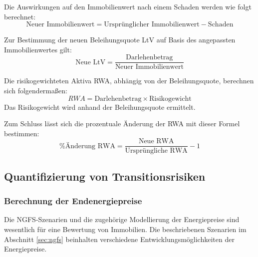 Die Auswirkungen auf den Immobilienwert nach einem Schaden werden wie folgt berechnet:
\begin{equation}
    \text{Neuer Immobilienwert} = \text{Ursprünglicher Immobilienwert} - \text{Schaden}
\end{equation}

Zur Bestimmung der neuen Beleihungsquote \ac{LtV} auf Basis des angepassten Immobilienwertes gilt:
\begin{equation}
    \text{Neue LtV} = \frac{\text{Darlehenbetrag}}{\text{Neuer Immobilienwert}}
\end{equation}

Die risikogewichteten Aktiva \acs{RWA}, abhängig von der Beleihungsquote, berechnen sich folgendermaßen:
\begin{equation}
    RWA = \text{Darlehenbetrag} \times \text{Risikogewicht}
\end{equation}
Das Risikogewicht wird anhand der Beleihungsquote ermittelt.

Zum Schluss lässt sich die prozentuale Änderung der \acs{RWA} mit dieser Formel bestimmen:
\begin{equation}
    \% \text{Änderung RWA} = \frac{\text{Neue RWA}}{\text{Ursprüngliche RWA}} - 1
\end{equation}
\subsection{Quantifizierung von Transitionsrisiken}
\subsubsection{Berechnung der Endenergiepreise}
Die \ac{NGFS}-Szenarien und die zugehörige Modellierung der Energiepreise sind wesentlich für eine Bewertung von Immobilien. Die beschriebenen Szenarien im Abschnitt \ref{sec:ngfs} beinhalten verschiedene Entwicklungsmöglichkeiten der Energiepreise.

